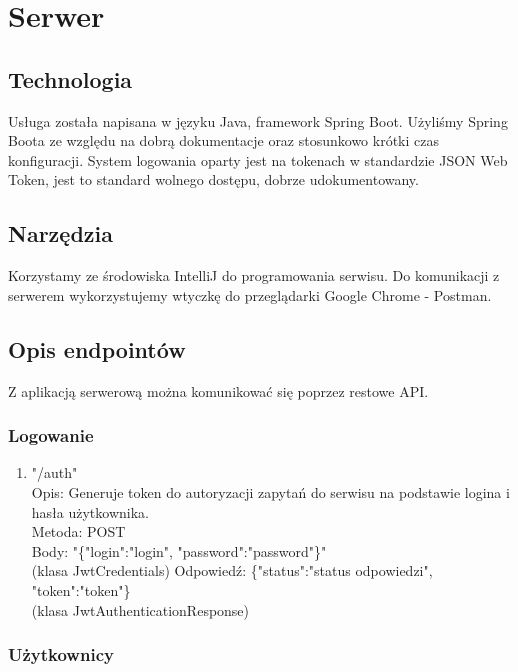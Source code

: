 \documentclass[12pt, titlepage]{article}
\begin{document}
\section{Serwer}

\subsection{Technologia}
Usługa została napisana w języku Java, framework Spring Boot. Użyliśmy Spring Boota ze względu na dobrą dokumentacje oraz stosunkowo krótki czas konfiguracji. System logowania oparty jest na tokenach w standardzie JSON Web Token, jest to standard wolnego dostępu, dobrze udokumentowany.

\subsection{Narzędzia}

Korzystamy ze środowiska IntelliJ do programowania serwisu. Do komunikacji z serwerem wykorzystujemy wtyczkę do przeglądarki Google Chrome - Postman.

\subsection{Opis endpointów}

Z aplikacją serwerową można komunikować się poprzez restowe API.

\subsubsection{Logowanie}

\begin{enumerate}

	\item "/auth" \\
	Opis: Generuje token do autoryzacji zapytań do serwisu na podstawie logina i hasła użytkownika.\\
		Metoda: POST\\
		Body: "\{"login":"login", "password":"password"\}"\\ (klasa JwtCredentials)
		Odpowiedź: \{"status":"status odpowiedzi", "token":"token"\}\\
		(klasa JwtAuthenticationResponse)
	
\end{enumerate}

\subsubsection{Użytkownicy}
\end{document}
